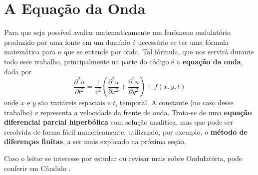 \section{A Equação da Onda}

	Para que seja possível avaliar matematicamente um fenômeno ondulatório 
	produzido por uma fonte em um domínio é necessário se ter uma fórmula 
	matemática para o que se entende por onda. Tal fórmula, que nos servirá 
	durante todo esse trabalho, principalmente na parte do código é a 
	\textbf{equação da onda}, dada por 
	\begin{equation}
		\label{eq:waveEq}
		\dfrac{\partial^2 u}{\partial t^2} = 
			\dfrac{1}{v^2}
			\left(\dfrac{\partial^2 u}{\partial x^2} + 
			\dfrac{\partial^2 u}{\partial y^2}\right) + f(x, y, t)
	\end{equation}
	onde $x$ e $y$ são variáveis espaciais e $t$, temporal. A constante (no caso
	desse trabalho) $v$ representa a velocidade da frente de onda. Trata-se de uma 
	\textbf{equação diferencial parcial hiperbólica} com solução analítica, mas que 
	pode ser resolvida de forma fácil numericamente, utilizando, por exemplo, o 
	\textbf{método de diferenças finitas}, a ser mais explicado na próxima seção.
	
	Caso o leitor se interesse por estudar ou revisar mais sobre Ondulatória, pode 
	conferir em Cândido \cite{mfcandido2018}.
